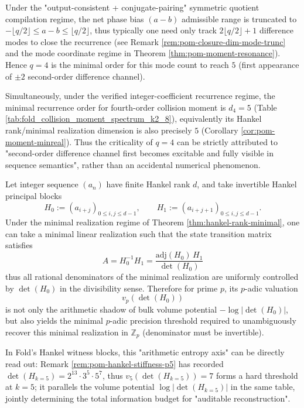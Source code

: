 
\begin{remark}[\texorpdfstring{$q=4$}{q=4} Minimal Five-Mode Opening: Difference-Mode Truncation and Hankel Rank First Alignment]\label{rem:pom-q4-minimal-five-mode-opening}
Under the "output-consistent + conjugate-pairing" symmetric quotient compilation regime, the net phase bias \((a-b)\) admissible range is truncated to
\(-\lfloor q/2\rfloor\le a-b\le \lfloor q/2\rfloor\),
thus typically one need only track \(2\lfloor q/2\rfloor+1\) difference modes to close the recurrence (see Remark \ref{rem:pom-closure-dim-mode-trunc} and the mode coordinate regime in Theorem \ref{thm:pom-moment-resonance}).
Hence \(q=4\) is the minimal order for this mode count to reach \(5\) (first appearance of \(\pm 2\) second-order difference channel).
\par
Simultaneously, under the verified integer-coefficient recurrence regime, the minimal recurrence order for fourth-order collision moment is \(d_4=5\) (Table \ref{tab:fold_collision_moment_spectrum_k2_8}), equivalently its Hankel rank/minimal realization dimension is also precisely \(5\) (Corollary \ref{cor:pom-moment-minreal}).
Thus the criticality of \(q=4\) can be strictly attributed to "second-order difference channel first becomes excitable and fully visible in sequence semantics", rather than an accidental numerical phenomenon.
\end{remark}

\begin{remark}\label{rem:pom-hankel-arithmetic-entropy-barrier}
Let integer sequence \((a_n)\) have finite Hankel rank \(d\), and take invertible Hankel principal blocks
\[
H_0:=(a_{i+j})_{0\le i,j\le d-1},
\qquad
H_1:=(a_{i+j+1})_{0\le i,j\le d-1}.
\]
Under the minimal realization regime of Theorem \ref{thm:hankel-rank-minimal}, one can take a minimal linear realization such that the state transition matrix satisfies
\[
\boxed{\;
A=H_0^{-1}H_1=\frac{\mathrm{adj}(H_0)\,H_1}{\det(H_0)}\;}
\]
thus all rational denominators of the minimal realization are uniformly controlled by \(\det(H_0)\) in the divisibility sense.
Therefore for prime \(p\), its \(p\)-adic valuation
\[
v_p(\det(H_0))
\]
is not only the arithmetic shadow of bulk volume potential \(-\log|\det(H_0)|\), but also yields the minimal \(p\)-adic precision threshold required to unambiguously recover this minimal realization in \(\mathbb{Z}_p\) (denominator must be invertible).
\par
In Fold's Hankel witness blocks, this "arithmetic entropy axis" can be directly read out: Remark \ref{rem:pom-hankel-stiffness-p5} has recorded
\(
\det(H_{k=5})=2^{13}\cdot 3^5\cdot 5^7
\),
thus \(v_5(\det(H_{k=5}))=7\) forms a hard threshold at \(k=5\); it parallels the volume potential \(\log|\det(H_{k=5})|\) in the same table, jointly determining the total information budget for "auditable reconstruction".
\end{remark}

